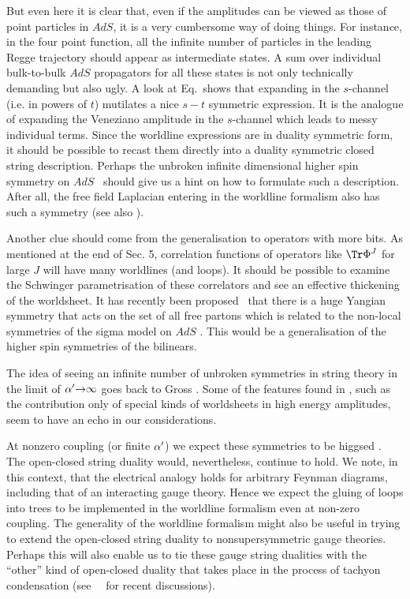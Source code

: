 But even here it is clear that, even if the amplitudes 
can be viewed as those of point particles in $AdS$, it is a very cumbersome way of doing things.  
For instance, in the four point function, all the infinite number of particles in the leading Regge 
trajectory should appear as intermediate states. A sum over individual bulk-to-bulk $AdS$ propagators 
for all these states is not only technically demanding but also ugly. A look at Eq.\fullfour\ shows 
that expanding in the $s$-channel (i.e. in powers of $t$) mutilates a nice $s-t$ symmetric expression. 
It is the analogue of expanding the Veneziano amplitude in the $s$-channel which leads to messy
individual terms. Since the worldline expressions are in duality symmetric form, it should be possible 
to recast them directly into a duality symmetric closed string description. Perhaps the unbroken infinite 
dimensional higher spin symmetry on $AdS$ \vasrev\vas\sezsun\pol\witt\mikh\
should give us a hint on how to formulate such a 
description. After all, the free field Laplacian entering in the worldline formalism 
also has such a symmetry \east (see also \anselmi ).

Another clue should come from the generalisation to operators with more bits. As mentioned at the end of 
Sec. 5, correlation functions of operators like $\Tr\Phi^J$ for large $J$ will have many worldlines 
(and loops). It should be possible to examine the Schwinger parametrisation of these correlators 
and see an effective thickening of the worldsheet. It has recently been proposed \dnw\ that there is a
huge Yangian symmetry that acts on the set of all free partons which is related to the non-local
symmetries of the sigma model on $AdS$ \msw\bnp\vall . This would be a generalisation of the 
higher spin symmetries of the bilinears. 


The idea of seeing an infinite number of unbroken symmetries in string theory in the limit 
of $\alpha^{\prime}{\rightarrow}\infty$ 
goes back to Gross \gross\gm . Some of the 
features found in \gm , such as the contribution only of special kinds of worldsheets 
in high energy amplitudes, seem to have an echo in our considerations.\foot{We thank David Gross for 
discussions on these matters.} 

At nonzero coupling (or finite $\alpha^{\prime}$) we expect these symmetries to be higgsed 
\witt\por\bianchi . The open-closed string duality would, nevertheless, 
continue to hold. We note, in this context,
that the electrical analogy holds for arbitrary Feynman diagrams, including that of an interacting
gauge theory. Hence we expect the gluing of loops into trees to be implemented in the worldline formalism
even at non-zero coupling. 
The generality of the worldline formalism might also be useful in trying to extend the 
open-closed string duality to nonsupersymmetric gauge theories. Perhaps this will also
enable us to tie these gauge string dualities with the ``other'' kind of open-closed duality
that takes place in the process of tachyon condensation (see \ashoke\ \gir\ for recent discussions).


